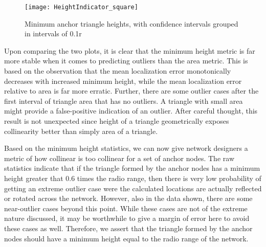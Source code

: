 \begin{figure}
  \centering
	\texttt{[image: HeightIndicator\_square]}
	\caption[Minimum anchor triangle heights]{Minimum anchor triangle heights, with confidence intervals grouped in intervals of 0.1r}	
	\label{fig:heightIndicator}
\end{figure}

Upon comparing the two plots, it is clear that the minimum height metric is far more stable when it comes to predicting outliers than the area metric.  This is based on the observation that the mean localization error monotonically decreases with increased minimum height, while the mean localization error relative to area is far more erratic.  Further, there are some outlier cases after the first interval of triangle area that has no outliers.  A triangle with small area might provide a false-positive indication of an outlier.  After careful thought, this result is not unexpected since height of a triangle geometrically exposes collinearity better than simply area of a triangle.

Based on the minimum height statistics, we can now give network designers a metric of how collinear is too collinear for a set of anchor nodes.  The raw statistics indicate that if the triangle formed by the anchor nodes has a minimum height greater that 0.6 times the radio range, then there is very low probability of getting an extreme outlier case were the calculated locations are actually reflected or rotated across the network.  However, also in the data shown, there are some near-outlier cases beyond this point.  While these cases are not of the extreme nature discussed, it may be worthwhile to give a margin of error here to avoid these cases as well.  Therefore, we assert that the triangle formed by the anchor nodes should have a minimum height equal to the radio range of the network.
